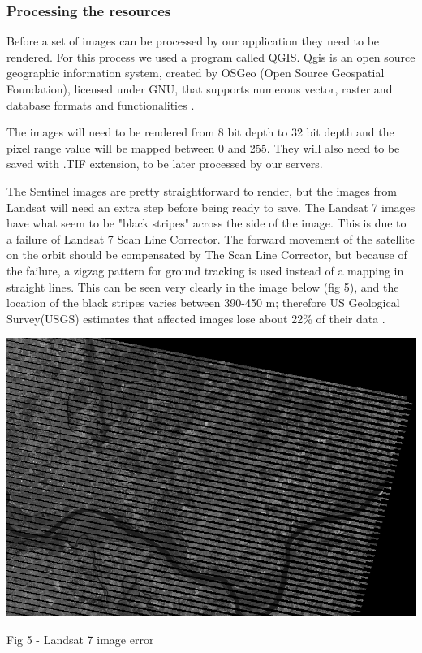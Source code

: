 \documentclass[12pt, a4paper]{report}
\begin{document}
\subsubsection{Processing the resources}

\quad
Before a set of images can be processed by our application they need to be rendered. For this process we used a program called QGIS. Qgis is an open source geographic information system, created by OSGeo (Open Source Geospatial Foundation), licensed under GNU, that supports numerous vector, raster and database formats and functionalities \cite{QGIS}.
\par 

The images will need to be rendered from 8 bit depth to 32 bit depth and the pixel range value will be mapped between 0 and 255. They will also need to be saved with .TIF extension, to be later processed by our servers.
\par 

The Sentinel images are pretty straightforward to render, but the images from Landsat will need an extra step before being ready to save. The Landsat 7 images have what seem to be "black stripes" across the side of the image. This is due to a failure of Landsat 7 Scan Line Corrector. The forward movement of the satellite on the orbit should be compensated by The Scan Line Corrector, but because of the failure, a zigzag pattern for ground tracking is used instead of a mapping in straight lines. This can be seen very clearly in the image below (fig 5), and the location of the black stripes varies between 390-450 m; therefore US Geological Survey(USGS) estimates that affected images lose about 22\% of their data \cite{Landsat-error}.

\bigskip

\includegraphics[scale=0.54, center]{landsat_black_stripes.png} 
\begin{center}
Fig 5 - Landsat 7 image error
\end{center}
\par 
\end{document}
